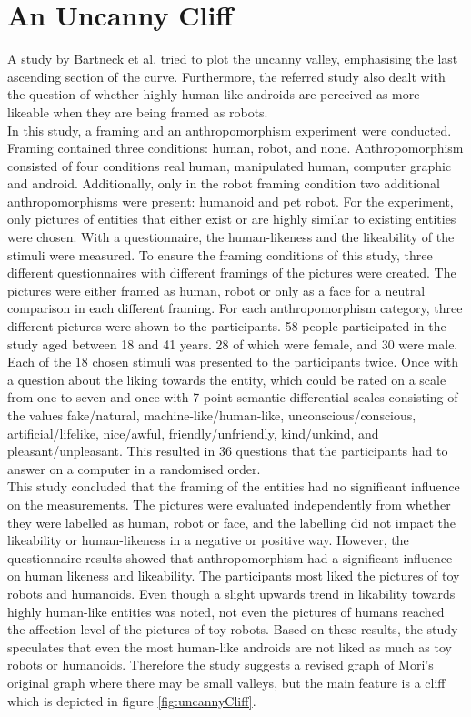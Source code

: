 \section{An Uncanny Cliff}
A study by Bartneck et al. \cite{uncanny_cliff} tried to plot the uncanny valley, emphasising the last ascending section of the curve. Furthermore, the referred study also dealt with the question of whether highly human-like androids are perceived as more likeable when they are being framed as robots.\\
In this study, a framing and an anthropomorphism experiment were conducted. Framing contained three conditions: human, robot, and none. Anthropomorphism consisted of four conditions real human, manipulated human, computer graphic and android. Additionally, only in the robot framing condition two additional anthropomorphisms were present: humanoid and pet robot. For the experiment, only pictures of entities that either exist or are highly similar to existing entities were chosen. 
With a questionnaire, the human-likeness and the likeability of the stimuli were measured.
To ensure the framing conditions of this study, three different questionnaires with different framings of the pictures were created. The pictures were either framed as human, robot or only as a face for a neutral comparison in each different framing. For each anthropomorphism category, three different pictures were shown to the participants. 
58 people participated in the study aged between 18 and 41 years. 28 of which were female, and 30 were male.
Each of the 18 chosen stimuli was presented to the participants twice. Once with a question about the liking towards the entity, which could be rated on a scale from one to seven and once with 7-point semantic differential scales consisting of the values fake/natural, machine-like/human-like, unconscious/conscious, artificial/lifelike, nice/awful, friendly/unfriendly, kind/unkind, and pleasant/unpleasant. This resulted in 36 questions that the participants had to answer on a computer in a randomised order.\\
This study concluded that the framing of the entities had no significant influence on the measurements. The pictures were evaluated independently from whether they were labelled as human, robot or face, and the labelling did not impact the likeability or human-likeness in a negative or positive way.
 However, the questionnaire results showed that anthropomorphism had a significant influence on human likeness and likeability. The participants most liked the pictures of toy robots and humanoids. Even though a slight upwards trend in likability towards highly human-like entities was noted, not even the pictures of humans reached the affection level of the pictures of toy robots. Based on these results, the study speculates that even the most human-like androids are not liked as much as toy robots or humanoids. Therefore the study suggests a revised graph of Mori's original graph where there may be small valleys, but the main feature is a cliff which is depicted in figure \ref{fig:uncannyCliff}.
